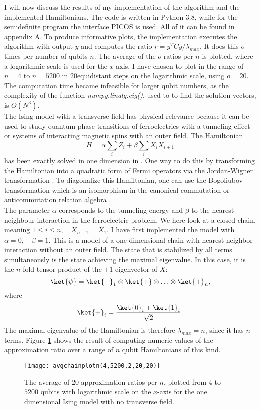 I will now discuss the results of my implementation of the algorithm and the implemented Hamiltonians.
The code is written in Python 3.8, while for the semidefinite program the interface PICOS is used.
All of it can be found in appendix A.
To produce informative plots, the implementation executes the algorithm with output $y$ and computes the ratio $r=y^{T}Cy/\lambda_{max}$.
It does this $o$ times per number of qubits $n$.
The average of the $o$ ratios per $n$ is plotted, where a logarithmic scale is used for the $x$-axis.
I have chosen to plot in the range of $n=4$ to $n=5200$ in $20 $equidistant steps on the logarithmic scale, using $o=20$.
The computation time became infeasible for larger qubit numbers, as the complexity of the function \emph{numpy.linalg.eig()}, used to to find the solution vectors, is $O\left(N^3\right) $.\\
The Ising model with a transverse field has physical relevance because it can be used to study quantum phase transitions of ferroelectrics with a tunneling effect or systems of interacting magnetic spins with an outer field.
The Hamiltonian
\[
H=\alpha \sum_{i} Z_i + \beta \sum_{i} X_iX_{i+1}
\]
has been exactly solved in one dimension in \cite{pfeuty70}.
One way to do this by transforming the Hamiltonian into a quadratic form of Fermi operators via the Jordan-Wigner transformation \cite{nielsen05}.
To diagonalize this Hamiltonian, one can use the Bogoliubov transformation which is an isomorphism in the canonical commutation or anticommutation relation algebra \cite{bogoljubov58}.\\
The parameter $\alpha$ corresponds to the tunneling energy and $\beta$ to the nearest neighbour interaction in the ferroelectric problem.
We here look at a closed chain, meaning $1\le i \le n, \quad X_{n+1}=X_{1}$.
I have first implemented the model with $\alpha =0, \quad \beta =1$.
This is a model of a one-dimensional chain with nearest neighbor interaction without an outer field.
The state that is stabilized by all terms simultaneously is the state achieving the maximal eigenvalue.
In this case, it is the $n$-fold tensor product of the $+1$-eigenvector of $X$: \[
	\ket{\psi}= \ket{+}_1\otimes\ket{+}\otimes\ldots\otimes\ket{+}_n
,\] where \[
\ket{+}_i= \frac{\ket{0}_i+\ket{1}_i}{\sqrt{2}}
.\]
The maximal eigenvalue of the Hamiltonian is therefore $\lambda_{max}=n$, since it has $n$ terms.
Figure \ref{fig:1} shows the result of computing numeric values of the approximation ratio over a range of $n$ qubit Hamiltonians of this kind.
\begin{figure}[H]
	\centering
	\texttt{[image: avgchainplotn(4,5200,2,20,20)]}
	\caption{The average of $20$ approximation ratios per $n$, plotted from $4$ to $5200$ qubits with logarithmic scale on the $x$-axis for the one dimensional Ising model with no transverse field.}
	\label{fig:1}
\end{figure}
